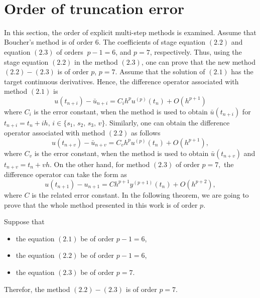 ‎\documentclass[a4paper,10pt]{article}‎
\begin{document}
\section{\textbf{Order of truncation error}}
In this section, the order of explicit multi-step methods is examined. Assume that Boucher's method is of order 6. 
The coefficients of stage equation $(2.2)$   and equation $(2.3)$  of orders $\ p-1=6$,    and  $p=7$,  respectively. 
Thus, using the stage equation $(2.2)$ in the method $(2.3)$,   one can prove that
the new method $(2.2)-(2.3)$ is of order $p$,  $p=7$. Assume that the
solution of $(2.1)$ has the target continuous  derivatives. Hence, the difference operator associated with method $(2.1)$ is
\begin{equation}\label{3.1}
u(t_{n+i}) -\bar{u}_{n+i}=C_{i}h^{p}u^{(p)}(t_{n})+O(h^{p+1})
\end{equation}
where  $C_{i}$ is the error constant, when the method is used to obtain   $\bar{u}(t_{n+i})$ for $t_{n+i}=t_{n}+i h,\,i\in\{s_{1},\, s_{2},\,s_{3},\,v\}$.
Similarly, one can obtain the difference operator associated with method $(2.2)$ as  follows
\begin{equation}\label{3.2}
 u(t_{n+v}) -\bar{u}_{n+v}=C_{v}h^{p}u^{(p)}(t_{n})+O(h^{p+1}),
\end{equation}
where   $C_v$ is the error constant,   when the method is used to obtain  $\bar{u}(t_{n+v})$ and $t_{n+v}=t_{n}+vh$.
On the other hand, for method $(2.3)$ of order $p=7,$
the difference operator can take the form as
\begin{equation}\label{3.3}
 u(t_{n+1}) -u_{n+1}=Ch^{p+1}y^{(p+1)}(t_{n})+O(h^{p+2}),
\end{equation}
where $C$ is the  related error constant. In the following theorem, we are going to prove that the whole method presented in this work is of order $p.$
 \begin{theorem}\label{thm1}
 Suppose  that
\begin{itemize}
  \item the equation $(2.1)$ be of order $p-1=6$,
  \item  the equation $(2.2)$ be of order $p-1=6$,
\item  the equation $(2.3)$ be of order $p=7$.
\end{itemize}
Therefor, the   method $(2.2)-(2.3)$ is of order   $p=7$.
\end{theorem}
\end{document}
